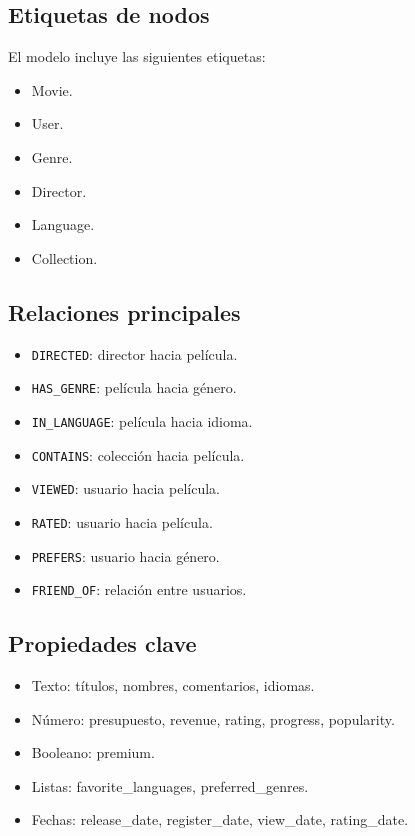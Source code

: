\documentclass[12pt,a4paper]{article}
\begin{document}
\subsection{Etiquetas de nodos}

El modelo incluye las siguientes etiquetas:

\begin{itemize}
    \item Movie.
    \item User.
    \item Genre.
    \item Director.
    \item Language.
    \item Collection.
\end{itemize}

\subsection{Relaciones principales}

\begin{itemize}
    \item \texttt{DIRECTED}: director hacia película.
    \item \texttt{HAS\_GENRE}: película hacia género.
    \item \texttt{IN\_LANGUAGE}: película hacia idioma.
    \item \texttt{CONTAINS}: colección hacia película.
    \item \texttt{VIEWED}: usuario hacia película.
    \item \texttt{RATED}: usuario hacia película.
    \item \texttt{PREFERS}: usuario hacia género.
    \item \texttt{FRIEND\_OF}: relación entre usuarios.
\end{itemize}

\subsection{Propiedades clave}

\begin{itemize}
    \item Texto: títulos, nombres, comentarios, idiomas.
    \item Número: presupuesto, revenue, rating, progress, popularity.
    \item Booleano: premium.
    \item Listas: favorite\_languages, preferred\_genres.
    \item Fechas: release\_date, register\_date, view\_date, rating\_date.
\end{itemize}
\end{document}

